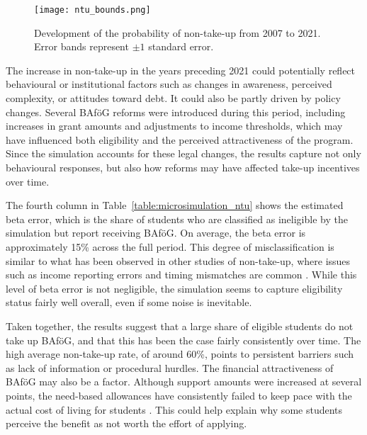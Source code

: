 \begin{figure}[htbp]
  \centering
  \texttt{[image: ntu\_bounds.png]}
\caption{Development of the probability of non-take-up from 2007 to 2021. 
Error bands represent $\pm 1$ standard error.}

  \label{fig:ntu_bounds_over_years}
\end{figure}

The increase in non-take-up in the years preceding 2021 could potentially reflect behavioural or institutional factors such as changes in awareness, perceived complexity, or attitudes toward debt. 
It could also be partly driven by policy changes. 
Several BAföG reforms were introduced during this period, including increases in grant amounts and adjustments to income thresholds, which may have influenced both eligibility and the perceived attractiveness of the program. 
Since the simulation accounts for these legal changes, the results capture not only behavioural responses, but also how reforms may have affected take-up incentives over time.


The fourth column in Table~\ref{table:microsimulation_ntu} shows the estimated beta error, which is the share of students who are classified as ineligible by the simulation but report receiving BAföG. 
On average, the beta error is approximately 15\% across the full period. 
This degree of misclassification is similar to what has been observed in other studies of non-take-up, where issues such as income reporting errors and timing mismatches are common \citep{frick_claim_2007}.
While this level of beta error is not negligible, the simulation seems to capture eligibility status fairly well overall, even if some noise is inevitable.

Taken together, the results suggest that a large share of eligible students do not take up BAföG, and that this has been the case fairly consistently over time. 
The high average non-take-up rate, of around 60\%, points to persistent barriers such as lack of information or procedural hurdles. 
The financial attractiveness of BAföG may also be a factor. 
Although support amounts were increased at several points, the need-based allowances have consistently failed to keep pace with the actual cost of living for students \citep{staack_von_2017}. 
This could help explain why some students perceive the benefit as not worth the effort of applying. 


